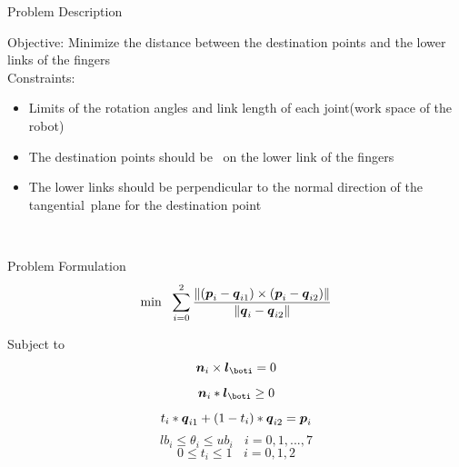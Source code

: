 \documentclass[10pt, compress]{beamer}
\begin{document}
\begin{frame}[fragile] {Problem Description} 

Objective: Minimize the distance between the destination points and the lower links of the fingers \\
	
Constraints: 
\begin{itemize}
\item Limits of the rotation angles and link length of each joint(work space of the  robot)
\item	The destination points should be  on the lower link of the fingers
\item	The lower links should be perpendicular to the normal direction of the tangential plane for the destination point
\end{itemize} 	
	
\end{frame}



\begin{frame}[fragile] {Problem Formulation} 
\[
\min \ \  \sum_{i=0}^{2} \frac{\|(\pb_i-\qb_{i1})\times (\pb_i-\qb_{i2}) \|}{\|\qb_i-\qb_{i2}\|}
\]

Subject to 
\[
\nb_i \times \lb_{\boti} =0
\]
\[
\nb_i * \lb_{\boti} \geq 0
\]
\[
 t_i* \mbox{\boldmath $q$}_{i1} +(1-t_i) * \mbox{\boldmath $q$}_{i2} = \mbox{\boldmath $p$}_i
\]
\[
lb_i \leq \theta_i \leq ub_i  \ \ \ \     i=0, 1, ..., 7
\]
\[
0 \leq t_i  \leq 1    \ \ \ \     i=0, 1, 2
\]

\end{frame}


\begin{frame}
	
\end{frame}
\end{document}

